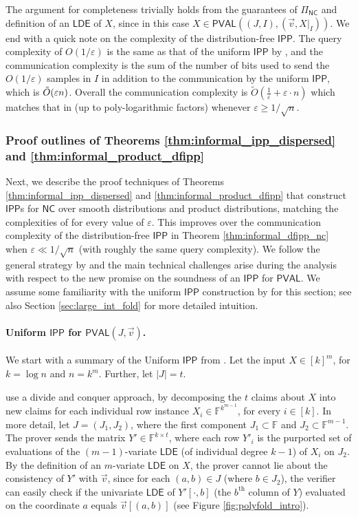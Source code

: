 \documentclass[10pt,a4paper]{article}
\newcommand{\NC}{\mathsf{NC}}
\newcommand{\PVAL}{\mathsf{PVAL}}
\newcommand{\IPP}{\mathsf{IPP}}
\newcommand{\LDE}{\mathsf{LDE}}
\newcommand{\F}{\mathbb{F}}
\newcommand{\eps}{\varepsilon}
\begin{document}
The argument for completeness trivially holds from the guarantees of $\Pi_\NC$ and definition of an $\LDE$ of $X$, since in this case $X \in \PVAL((J,I),(\Vec{v},X \vert_I))$. We end with a quick note on the complexity of the distribution-free $\IPP$. The query complexity of $O(1/\varepsilon)$ is the same as that of the uniform $\IPP$ by \cite{RR20_batch_polylog}, and the communication complexity is the sum of the number of bits used to send the $O(1/\varepsilon)$ samples in $I$ in addition to the communication by the uniform $\IPP$, which is $\Tilde{O}(\varepsilon n)$. Overall the communication complexity is $\tilde{O}\left(\frac{1}{\varepsilon}+\varepsilon\cdot n\right)$ which matches that in \cite{RR20_batch_polylog} (up to poly-logarithmic factors) whenever $\eps \geq 1/\sqrt{n}$. 

\subsubsection{Proof outlines of Theorems \ref{thm:informal_ipp_dispersed} and \ref{thm:informal_product_dfipp}}
\label{sec:technique_special_dist}
Next, we describe the proof techniques of Theorems \ref{thm:informal_ipp_dispersed} and \ref{thm:informal_product_dfipp} that construct $\IPP$s for $\NC$ over smooth distributions and product distributions, matching the complexities of \cite{RVW} for every value of $\varepsilon$. This improves over the communication complexity of the distribution-free $\IPP$ in Theorem \ref{thm:informal_dfipp_nc} when $\varepsilon \ll 1/\sqrt{n}$ (with roughly the same query complexity). We follow the general strategy by \cite{RVW} and the main technical challenges arise during the analysis with respect to the new promise on the soundness of an $\IPP$ for $\PVAL$. We assume some familiarity with the uniform $\IPP$ construction by \cite{RVW} for this section; see also Section \ref{sec:large_int_fold} for more detailed intuition.

\paragraph*{Uniform $\IPP$ for $\PVAL(J,\Vec{v})$.} We start with a summary of the Uniform $\IPP$ from \cite{RVW}. Let the input $X \in [k]^m$, for $k = \log n$ and $n = k^m$. Further, let $\vert J \vert = t$. 

\cite{RVW} use a divide and conquer approach, by decomposing the $t$ claims about $X$ into new claims for each individual row instance $X_i \in \F^{k^{m-1}}$, for every $i\in [k]$. In more detail, let $J = (J_1,J_2)$, where the first component $J_1 \subset \F$ and $J_2 \subset \F^{m-1}$. The prover sends the matrix $Y' \in \F^{k\times t}$, where each row $Y'_i$ is the purported set of evaluations of the $(m-1)$-variate $\LDE$ (of individual degree $k-1$) of $X_i$ on $J_2$. By the definition of an $m$-variate $\LDE$ on $X$, the prover cannot lie about the consistency of $Y'$ with $\Vec{v}$, since for each $(a,b) \in J$ (where $b \in J_2$), the verifier can easily check if the univariate $\LDE$ of $Y'[\cdot,b]$ (the $b^{\text{th}}$ column of $Y$) evaluated on the coordinate $a$ equals $\Vec{v}[(a,b)]$ (see Figure \ref{fig:polyfold_intro}).
\end{document}
